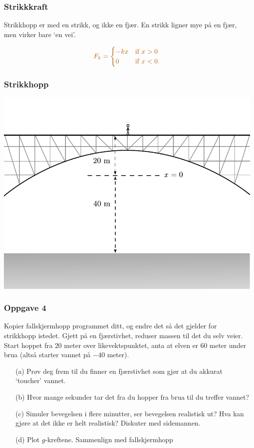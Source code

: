 \documentclass[english, 12pt]{beamer}
\newcommand{\alrt}{\color{AlertColor}}
\begin{document}
\begin{frame}
\frametitle{Strikkkraft}
Strikkhopp er med en strikk, og ikke en fjær. En strikk ligner mye på en fjær, men virker bare `en vei'.

$$\alrt F_k = \begin{cases}
-kx & \mbox{if } x > 0 \\
0 & \mbox {if } x < 0.
\end{cases}
$$
\end{frame}

\begin{frame}
\frametitle{Strikkhopp}
\begin{center}
\includegraphics[width=\textwidth]{Bungee_bridge}
\end{center}
\end{frame}

\begin{frame}
\frametitle{Oppgave 4}

Kopier fallskjermhopp programmet ditt, og endre det så det gjelder for strikkhopp istedet. Gjett på en fjærstivhet, reduser massen til det du selv veier. Start hoppet fra $20$ meter over likevektspunktet, anta at elven er 60 meter under brua (altså starter vannet på $-40$ meter). 

\begin{itemize}
	\item[(a)] Prøv deg frem til du finner en fjærstivhet som gjør at du akkurat `toucher' vannet.
	\item[(b)] Hvor mange sekunder tar det fra du hopper fra brua til du treffer vannet?
	\item[(c)] Simuler bevegelsen i flere minutter, ser bevegelsen realistisk ut? Hva kan gjøre at det ikke er helt realistisk? Diskuter med sidemannen.
	\item[(d)] Plot $g$-kreftene. Sammenlign med fallskjermhopp
\end{itemize}

\end{frame}
\end{document}
